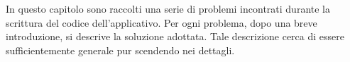 In questo capitolo sono raccolti una serie di problemi incontrati durante la scrittura del codice dell'applicativo. Per ogni problema, dopo una breve introduzione, si descrive la soluzione adottata. Tale descrizione
cerca di essere sufficientemente generale pur scendendo nei dettagli.